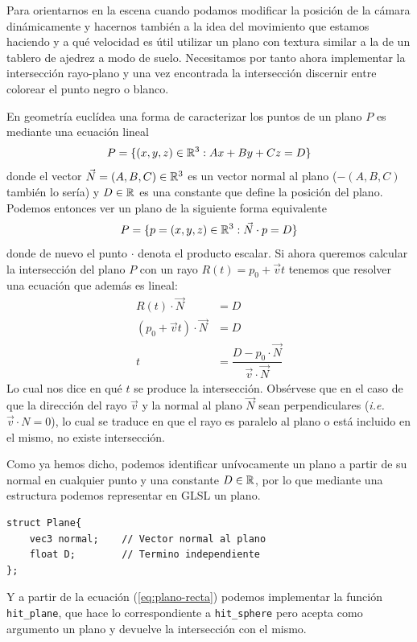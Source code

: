 Para orientarnos en la escena cuando podamos modificar la posición de la cámara dinámicamente y hacernos también a la idea del movimiento que estamos haciendo y a qué velocidad es útil utilizar un plano con textura similar a la de un tablero de ajedrez a modo de suelo. Necesitamos por tanto ahora implementar la intersección rayo-plano y una vez encontrada la intersección discernir entre colorear el punto negro o blanco.

En geometría euclídea una forma de caracterizar los puntos de un plano $P$ es mediante una ecuación lineal
$$
P = \{(x,y,z)\in\mathbb{R}^3:Ax+By+Cz=D\}
$$
donde el vector $\vec N=(A,B,C)\in\mathbb{R}^3$ es un vector normal al plano ($-(A,B,C)$ también lo sería) y $D\in\mathbb{R}$ es una constante que define la posición del plano. Podemos entonces ver un plano de la siguiente forma equivalente
$$
P = \{p=(x,y,z)\in\mathbb{R}^3:\vec N\cdot p = D\}
$$
donde de nuevo el punto $\cdot$ denota el producto escalar. Si ahora queremos calcular la intersección del plano $P$ con un rayo $R(t)=p_0+\vec vt$ tenemos que resolver una ecuación que además es lineal:
\begin{equation}
    \label{eq:plano-recta}
    \begin{split}
        R(t)\cdot \vec N &= D \\
        (p_0+\vec vt)\cdot \vec N & = D\\
        t &=\dfrac{D-p_0\cdot \vec N}{\vec v\cdot \vec N}
    \end{split}
\end{equation}
Lo cual nos dice en qué $t$ se produce la intersección. Obsérvese que en el caso de que la dirección del rayo $\vec v$ y la normal al plano $\vec N$ sean perpendiculares (\textit{i.e.} $\vec v\cdot N=0$), lo cual se traduce en que el rayo es paralelo al plano o está incluido en el mismo, no existe intersección.

Como ya hemos dicho, podemos identificar unívocamente un plano a partir de su normal en cualquier punto y una constante $D\in\mathbb{R}$, por lo que mediante una estructura podemos representar en GLSL un plano.

\begin{lstlisting}
struct Plane{
    vec3 normal;    // Vector normal al plano
    float D;        // Termino independiente
};
\end{lstlisting}

Y a partir de la ecuación (\ref{eq:plano-recta}) podemos implementar la función \verb|hit_plane|, que hace lo correspondiente a \verb|hit_sphere| pero acepta como argumento un plano y devuelve la intersección con el mismo.

